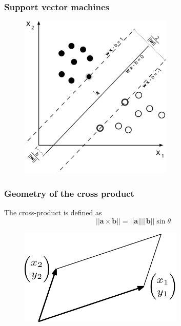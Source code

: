 \documentclass{beamer}
\begin{document}
\begin{frame}
\frametitle{Support vector machines}
\begin{figure}[t]
\begin{center}
\includegraphics[width=0.65\textwidth]{svm}
\caption{}
\end{center}
\end{figure}
\end{frame}
\begin{frame}
\frametitle{Geometry of the cross product}
The cross-product is defined as 
$$|| \mathbf{a} \times \mathbf{b}|| = || \mathbf{a} || ||\mathbf{b}|| \sin{\theta}$$    
\begin{figure}[htbp]
\begin{center}
 \includegraphics[width=0.7\textwidth]{parallelogram.png}
\caption{}
\end{center}
\end{figure}
\end{frame}
\end{document}

